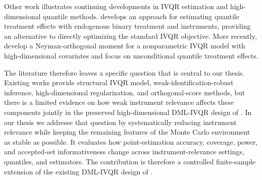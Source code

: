 Other work illustrates continuing developments in IVQR estimation and high-dimensional quantile methods. \textcite{wuthrich_2019} develops an approach for estimating quantile treatment effects with endogenous binary treatment and instruments, providing an alternative to directly optimizing the standard IVQR objective. More recently, \textcite{jin_sun_2025} develop a Neyman-orthogonal moment for a nonparametric IVQR model with high-dimensional covariates and focus on unconditional quantile treatment effects.

The literature therefore leaves a specific question that is central to our thesis. Existing works provide structural IVQR model, weak-identification-robust inference, high-dimensional regularization, and orthogonal-score methods, but there is a limited evidence on how weak instrument relevance affects these components jointly in the preserved high-dimensional DML-IVQR design of \textcite{chen_huang_tien_2021}. In our thesis we addresse that question by systematically reducing instrument relevance while keeping the remaining features of the Monte Carlo environment as stable as possible. It evaluates how point-estimation accuracy, coverage, power, and accepted-set informativeness change across instrument-relevance settings, quantiles, and estimators. The contribution is therefore a controlled finite-sample extension of the existing DML-IVQR design of \textcite{chen_huang_tien_2021}.
